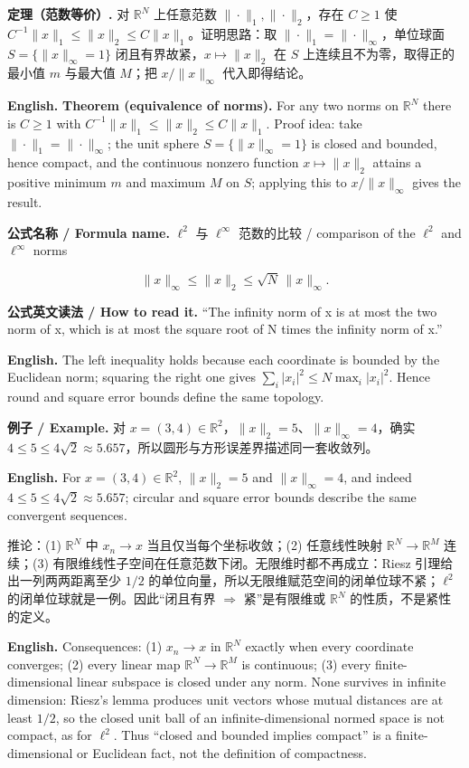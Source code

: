\documentclass[UTF8,11pt,a4paper]{ctexart}
\newcommand{\EN}[1]{\par\noindent\textbf{English.} #1\par}
\newcommand{\READ}[1]{\par\noindent\textbf{公式英文读法 / How to read it.} #1\par}
\newcommand{\FORMULA}[2]{\par\noindent\textbf{公式名称 / Formula name.} #1 / #2\par}
\newcommand{\EX}[2]{\par\noindent\textbf{例子 / Example.} #1\par\EN{#2}}
\begin{document}
\noindent\textbf{定理（范数等价）.} 对 $\mathbb R^N$ 上任意范数 $\|\cdot\|_1,\|\cdot\|_2$，存在 $C\ge1$ 使 $C^{-1}\|x\|_1\le\|x\|_2\le C\|x\|_1$。证明思路：取 $\|\cdot\|_1=\|\cdot\|_\infty$，单位球面 $S=\{\|x\|_\infty=1\}$ 闭且有界故紧，$x\mapsto\|x\|_2$ 在 $S$ 上连续且不为零，取得正的最小值 $m$ 与最大值 $M$；把 $x/\|x\|_\infty$ 代入即得结论。
\EN{\textbf{Theorem (equivalence of norms).} For any two norms on $\mathbb R^N$ there is $C\ge1$ with $C^{-1}\|x\|_1\le\|x\|_2\le C\|x\|_1$. Proof idea: take $\|\cdot\|_1=\|\cdot\|_\infty$; the unit sphere $S=\{\|x\|_\infty=1\}$ is closed and bounded, hence compact, and the continuous nonzero function $x\mapsto\|x\|_2$ attains a positive minimum $m$ and maximum $M$ on $S$; applying this to $x/\|x\|_\infty$ gives the result.}

\FORMULA{$\ell^2$ 与 $\ell^\infty$ 范数的比较}{comparison of the $\ell^2$ and $\ell^\infty$ norms}
\[
\|x\|_\infty\le\|x\|_2\le\sqrt N\,\|x\|_\infty .
\]
\READ{``The infinity norm of x is at most the two norm of x, which is at most the square root of N times the infinity norm of x.''}
\EN{The left inequality holds because each coordinate is bounded by the Euclidean norm; squaring the right one gives $\sum_i|x_i|^2\le N\max_i|x_i|^2$. Hence round and square error bounds define the same topology.}

\EX{对 $x=(3,4)\in\mathbb R^2$，$\|x\|_2=5$、$\|x\|_\infty=4$，确实 $4\le5\le4\sqrt2\approx5.657$，所以圆形与方形误差界描述同一套收敛列。}{For $x=(3,4)\in\mathbb R^2$, $\|x\|_2=5$ and $\|x\|_\infty=4$, and indeed $4\le5\le4\sqrt2\approx5.657$; circular and square error bounds describe the same convergent sequences.}

\noindent 推论：(1) $\mathbb R^N$ 中 $x_n\to x$ 当且仅当每个坐标收敛；(2) 任意线性映射 $\mathbb R^N\to\mathbb R^M$ 连续；(3) 有限维线性子空间在任意范数下闭。无限维时都不再成立：Riesz 引理给出一列两两距离至少 $1/2$ 的单位向量，所以无限维赋范空间的闭单位球不紧；$\ell^2$ 的闭单位球就是一例。因此“闭且有界 $\Rightarrow$ 紧”是有限维或 $\mathbb R^N$ 的性质，不是紧性的定义。
\EN{Consequences: (1) $x_n\to x$ in $\mathbb R^N$ exactly when every coordinate converges; (2) every linear map $\mathbb R^N\to\mathbb R^M$ is continuous; (3) every finite-dimensional linear subspace is closed under any norm. None survives in infinite dimension: Riesz's lemma produces unit vectors whose mutual distances are at least $1/2$, so the closed unit ball of an infinite-dimensional normed space is not compact, as for $\ell^2$. Thus ``closed and bounded implies compact'' is a finite-dimensional or Euclidean fact, not the definition of compactness.}
\end{document}
